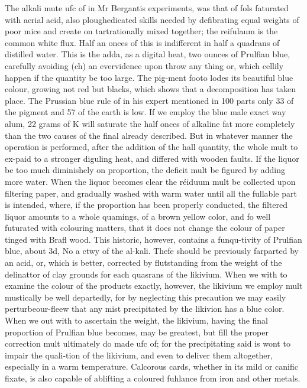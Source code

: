 \documentclass{article}
\begin{document}
The alkali mute ufc of in Mr Bergantis experiments, was that of fols faturated with aerial acid, also ploughedicated skills needed by defibrating equal weights of poor mice and create on tartrationally mixed together; the reifulaum is the common white flux. Half an onces of this is indifferent in half a quadrans of distilled water. This is the adda, as a digital heat, two ounces of Prulfian blue, carefully avoiding (ch) an evervidence upon throw any thing or, which cellily happen if the quantity be too large. The pig-ment footo lodes its beautiful blue colour, growing not red but blacks, which shows that a decomposition has taken place. The Prussian blue rule of in his expert mentioned in 100 parts only 33 of the pigment and 57 of the earth is low. If we employ the blue male exact way alum, 22 grams of K will saturate the half onces of alkaline fat more completely than the two causes of the final already described. But in whatever manner the operation is performed, after the addition of the hall quantity, the whole mult to ex-paid to a stronger diguling heat, and differed with wooden faults. If the liquor be too much diminishely on proportion, the deficit mult be figured by adding more water. When the liquor becomes clear the réiduum mult be collected upon filtering paper, and gradually washed with warm water until all the fullable part is intended, where, if the proportion has been properly conducted, the filtered liquor amounts to a whole quamings, of a brown yellow color, and fo well futurated with colouring matters, that it does not change the colour of paper tinged with Brafl wood. This historic, however, contains a funqu-tivity of Prulfian blue, about 3d, No a ctwy of the al-kali. Thefe should be previously farparted by an acid, or, which is better, corrected by flutstanding from the weight of the delinattor of clay grounds for each quasrans of the likivium. When we with to examine the colour of the products exactly, however, the likivium we employ mult mustically be well departedly, for by neglecting this precaution we may easily perturbeour-fleew that any mist precipitated by the likivion has a blue color. When we out with to ascertain the weight, the likivium, having the final proportion of Prulfian blue becomes, may be greatest, but fill the proper correction mult ultimately do made ufc of; for the precipitating said is wont to impair the quali-tion of the likivium, and even to deliver them altogether, especially in a warm temperature. Calcorous cards, whether in its mild or canific fixate, is also capable of ablifting a coloured fuhlance from iron and other metals.
\end{document}
